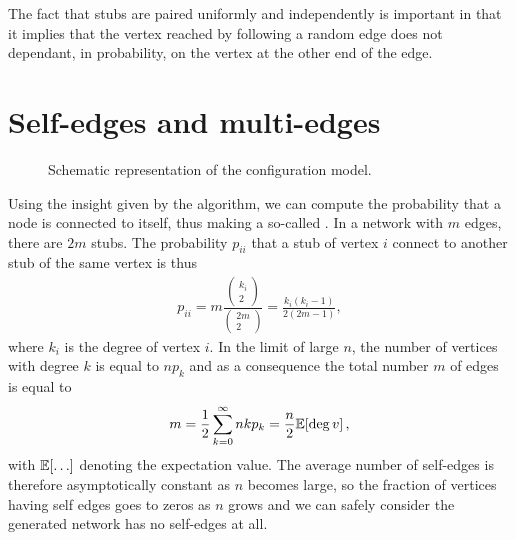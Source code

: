 \documentclass[
11pt, %
english, %
singlespacing, %
nolistspacing, %
liststotoc, %
headsepline, %
]{MastersDoctoralThesis} %
\begin{document}
The fact that stubs are paired uniformly and independently is important in that it implies that the vertex reached by following a random edge does not dependant, in probability, on the vertex at the other end of the edge.


\section{Self-edges and multi-edges}

\begin{figure}
	
	\caption{Schematic representation of the configuration model.}
	\label{Figure: Configuration model}
\end{figure}

Using the insight given by the algorithm, we can compute the probability that a node is connected to itself, thus making a so-called . In a network with $m$ edges, there are $2 m$ stubs. The probability $p_{ii}$ that a stub of vertex $i$ connect to another stub of the same vertex is thus
\begin{align}
	p_{ii} = m \frac{ \begin{pmatrix} k_i \\ 2 \end{pmatrix} }{ \begin{pmatrix} 2m \\ 2 \end{pmatrix} } = \frac{k_i (k_i - 1)}{2 (2m - 1)},
\end{align}
where $k_i$ is the degree of vertex $i$. In the limit of large $n$, the number of vertices with degree $k$ is equal to $n p_k$ and as a consequence the total number $m$ of edges is equal to
\begin{align}
	m = \frac{1}{2} \sum_{k = 0}^\infty n k p_k = \frac{n}{2} \mathbb{E}\!\left[ \deg{v} \right],
\end{align}
with $\expected{\dots}$ denoting the expectation value. The average number of self-edges is therefore asymptotically constant as $n$ becomes large, so the fraction of vertices having self edges goes to zeros as $n$ grows and we can safely consider the generated network has no self-edges at all.
\end{document}
